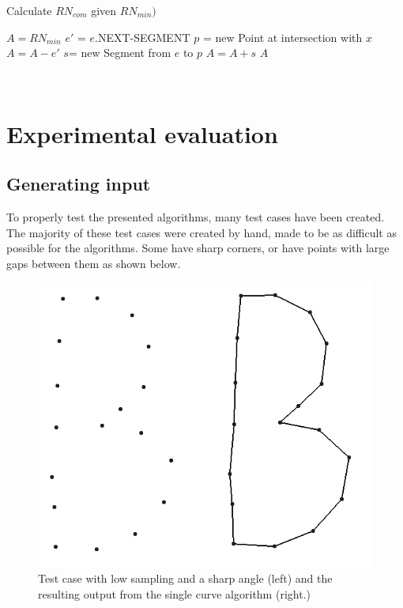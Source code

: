 \documentclass[11pt]{article}
\begin{document}
\begin{algorithm}
\caption{Calculate $RN_{com}$ given $RN_{min})$}
\begin{algorithmic} 
\STATE $A= RN_{min}$
\STATE $e'$ = $e$.NEXT-SEGMENT
\STATE $p$ = new Point at intersection with $x$
\STATE $A=A-e'$
\STATE $s$= new Segment from $e$ to $p$
\STATE $A=A+s$
\ENDIF
\ENDIF
\ENDIF
\ENDFOR
\RETURN $A$
\end{algorithmic}
\label{alg:RNcomalg}
\end{algorithm}$ $\\

\section{Experimental evaluation}
\subsection{Generating input}
To properly test the presented algorithms, many test cases have been created. The majority of these test cases were created by hand, made to be as difficult as possible for the algorithms. Some have sharp corners, or have points with large gaps between them as shown below. %

\begin{figure}[ht!]
\centering
\includegraphics[scale=0.2]{anglesamplerate.png}
\caption{Test case with low sampling and a sharp angle (left) and the resulting output from the single curve algorithm (right.)}
\label{single}
\end{figure}
\end{document}
